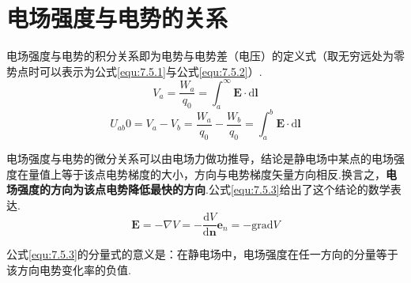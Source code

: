 \section{电场强度与电势的关系}
电场强度与电势的积分关系即为电势与电势差（电压）的定义式（取无穷远处为零势点时可以表示为公式\ref{equ:7.5.1}与公式\ref{equ:7.5.2}）.
\begin{equation}
    V_a=\dfrac{W_a}{q_0}=\int_{a}^{\infty}\bm{E}\cdot \mathrm{d}\bm{l}
    \label{equ:7.5.1}
\end{equation}
\begin{equation}
    U_{ab}0=V_a-V_b=\dfrac{W_a}{q_0}-\dfrac{W_b}{q_0}=\int_{a}^{b}\bm{E}\cdot \mathrm{d}\bm{l}
    \label{equ:7.5.2}
\end{equation}

电场强度与电势的微分关系可以由电场力做功推导，结论是静电场中某点的电场强度在量值上等于该点电势梯度的大小，方向与电势梯度矢量方向相反.换言之，\textbf{电场强度的方向为该点电势降低最快的方向}.公式\ref{equ:7.5.3}给出了这个结论的数学表达.
\begin{equation}
    \bm{E}=-\nabla V=-\dfrac{\mathrm{d}V}{\mathrm{d}\bm{n}}\bm{e}_n=-\mathrm{grad}V
    \label{equ:7.5.3}
\end{equation}

公式\ref{equ:7.5.3}的分量式的意义是：在静电场中，电场强度在任一方向的分量等于该方向电势变化率的负值.